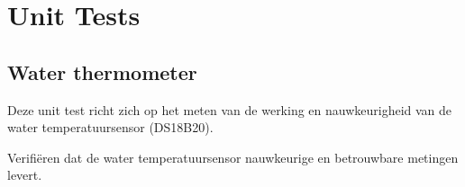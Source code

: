 \documentclass[a4paper]{report}
\newcommand{\turtleguard}{\mbox{TurtleGuard\texttrademark}\xspace}
\begin{document}


\section{Unit Tests}

\subsection{Water thermometer}

\begin{tcolorbox}[colback=white, colframe=black, title=Beschrijving van de Unit]
Deze unit test richt zich op het meten van de werking en nauwkeurigheid van de water temperatuursensor (DS18B20). 
\end{tcolorbox}

\begin{tcolorbox}[colback=white, colframe=black, title=Test Doel]
Verifiëren dat de water temperatuursensor nauwkeurige en betrouwbare metingen levert.
\end{tcolorbox}
\end{document}
